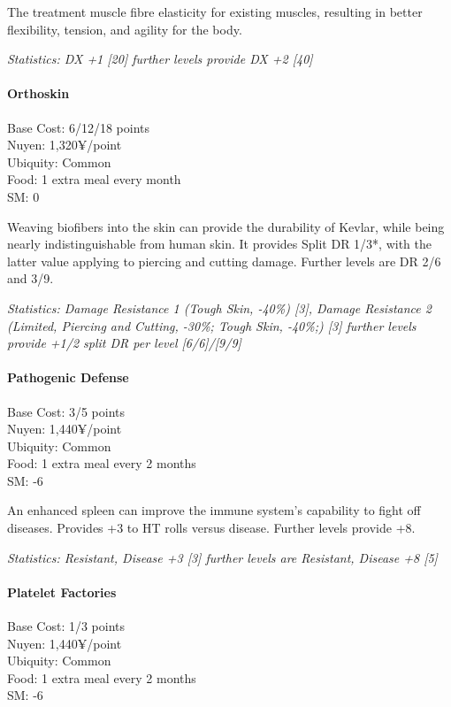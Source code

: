 \begin{multicols*}{3}
	The treatment muscle fibre elasticity for existing muscles, resulting in better flexibility, tension, and agility for the body.
	
	\textit{\textcolor{OliveGreen}{Statistics: DX +1 [20] further levels provide DX +2 [40]}}
	
	\paragraph{Orthoskin}
	\begin{flushright}
		Base Cost: 6/12/18 points\\
		Nuyen: 1,320¥/point\\
		Ubiquity: Common\\
		Food: 1 extra meal every month\\
		SM: 0\\
	\end{flushright}
	
	Weaving biofibers into the skin can provide the durability of Kevlar, while being nearly indistinguishable from human skin. It provides Split DR 1/3*, with the latter value applying to piercing and cutting damage. Further levels are DR 2/6 and 3/9.
	
	\textit{\textcolor{OliveGreen}{Statistics: Damage Resistance 1 (Tough Skin, -40\%) [3], Damage Resistance 2 (Limited, Piercing and Cutting, -30\%; Tough Skin, -40\%;) [3] further levels provide +1/2 split DR per level [6/6]/[9/9]}}
	
	\paragraph{Pathogenic Defense}
	\begin{flushright}
		Base Cost: 3/5 points\\
		Nuyen: 1,440¥/point\\
		Ubiquity: Common\\
		Food: 1 extra meal every 2 months\\
		SM: -6\\
	\end{flushright}
	
	An enhanced spleen can improve the immune system's capability to fight off diseases. Provides +3 to HT rolls versus disease.  Further levels provide +8.
	
	\textit{\textcolor{OliveGreen}{Statistics: Resistant, Disease +3 [3] further levels are Resistant, Disease +8 [5]}}
	
	\paragraph{Platelet Factories}
	\begin{flushright}
		Base Cost: 1/3 points\\
		Nuyen: 1,440¥/point\\
		Ubiquity: Common\\
		Food: 1 extra meal every 2 months\\
		SM: -6\\
	\end{flushright}


\end{multicols*}
